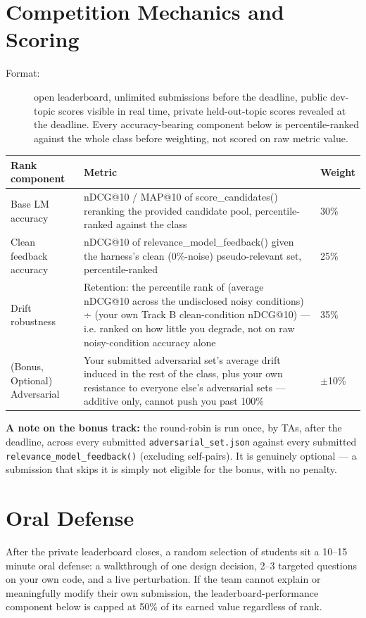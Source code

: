 \documentclass[10pt]{article}
\begin{document}
\section{Competition Mechanics and Scoring}
\label{sec:scoring}
\begin{description}
\item[Format:] open leaderboard, unlimited submissions before the deadline, public dev-topic scores visible in real time, private held-out-topic scores revealed at the deadline. Every accuracy-bearing component below is percentile-ranked against the whole class before weighting, not scored on raw metric value. 
\end{description}

\begin{center}
\begin{tabular}{|l | p{7cm} | l |}
\hline
\textbf{Rank component}	& \textbf{Metric} &\textbf{	Weight}\\
\hline
\hline
Base LM accuracy	& nDCG@10 / MAP@10 of score\_candidates() reranking the provided candidate pool, percentile-ranked against the class	 & 30\%\\
\hline
Clean feedback accuracy&	nDCG@10 of relevance\_model\_feedback() given the harness's clean (0\%-noise) pseudo-relevant set, percentile-ranked &	25\%\\
\hline
Drift robustness& 	Retention: the percentile rank of (average nDCG@10 across the undisclosed noisy conditions) ÷ (your own Track B clean-condition nDCG@10) — i.e. ranked on how little you degrade, not on raw noisy-condition accuracy alone	&  35\% \\
\hline
(Bonus, Optional) Adversarial	& Your submitted adversarial set's average drift induced in the rest of the class, plus your own resistance to everyone else's adversarial sets — additive only, cannot push you past 100\%	& $\pm$10\% \\
\hline
\end{tabular}
\end{center}

\textbf{A note on the bonus track:} the round-robin is run once, by TAs, after the deadline, across every submitted \texttt{adversarial\_set.json} against every submitted \texttt{relevance\_model\_feedback()} (excluding self-pairs). It is genuinely optional — a submission that skips it is simply not eligible for the bonus, with no penalty. 


\section{Oral Defense}
After the private leaderboard closes, a random selection of students sit a 10–15 minute oral defense: a walkthrough of one design decision, 2–3 targeted questions on your own code, and a live perturbation. If the team cannot explain or meaningfully modify their own submission, the leaderboard-performance component below is capped at 50\% of its earned value regardless of rank.
\end{document}
